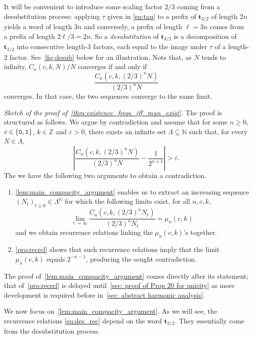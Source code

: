 \documentclass[12pt,reqno]{article}
\newcommand{\cA}{\{{\tt 0},{\tt 1}\}}
\newcommand{\N}{\mathbb{N}}
\newcommand{\Z}{\mathbb{Z}}
\begin{document}
It will be convenient to introduce some scaling factor $2/3$ coming from a desubstitution process: applying $\tau$ given in \eqref{eq:tau} to a prefix of $\mathbf{t}_{3/2}$  of length $2n$ yields a word of length $3n$ and conversely, a prefix of length $\ell=3n$ comes from a prefix of length $2\ell/3=2n$. So a {\em desubstitution} of $\mathbf{t}_{3/2}$ is a decomposition of $\mathbf{t}_{3/2}$ into consecutive length-$3$ factors, each equal to the image under $\tau$ of a length-$2$ factor.  See~\cref{fig:desub} below for an illustration. 
Note that, as $N$ tends to infinity, $C_n(c,k,N)/N$ converges if and only if
\[
  \frac{C_{n}\left(c,k, \left(2/3\right)^{n} N \right)}{ \left(2/3\right)^{n}N}
\]
converges. In that case, the two sequences converge to the same limit.

\medskip

{\em Sketch of the proof of~\cref{thm:existence_freqs_iff_mun_exist}.} The proof is structured as follows.  We argue by contradiction and assume that for some $n \ge 0$,  $c \in \cA$, $k \in \Z$ and $\varepsilon > 0$, there exists an infinite set $\Lambda \subseteq \N$ such that, for every $N \in \Lambda$,
\[
  \left| \frac{C_{n}(c,k,\left(2/3\right)^{n}N)}{\left(2/3\right)^{n} N} -\frac{1}{2^{n+1}}\right|>\varepsilon.
\]
The we have the following two arguments to obtain a contradiction.
\begin{enumerate}
\item \cref{lem:main_compacity_argument} enables us to extract an increasing sequence $(N_t)_{t\ge0}\in\Lambda^\N$ for which the following limits exist, for all $n,c,k$, 
  \[
    \lim_{t\to\infty} \frac{C_{n}(c,k,\left(2/3\right)^{n}N_t)}{\left(2/3\right)^{n} N_t} = \mu_{n}(c,k)
  \]
  and we obtain recurrence relations linking the $\mu_{n}(c,k)$'s together.
\item \cref{pro:recrel} shows that such recurrence relations imply that the limit $\mu_{n}(c,k)$ equals $2^{-n-1}$, producing the sought contradiction.
\end{enumerate}
The proof of~\cref{lem:main_compacity_argument} comes directly after its statement; that of~\cref{pro:recrel} is delayed until~\cref{sec: proof of Prop 20 for unicity} as more development is required before in~\cref{sec: abstract harmonic analysis}.

We now focus on~\cref{lem:main_compacity_argument}.
As we will see, the recurrence relations \eqref{eq:des_rec} depend on the word $\mathbf{t}_{3/2}$. They essentially come from the desubstitution process.
\end{document}

